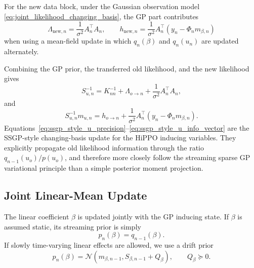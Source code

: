 \documentclass[12pt]{article}
\begin{document}
For the new data block, under the Gaussian observation model
\eqref{eq:joint_likelihood_changing_basis}, the GP part contributes
\begin{equation}
    \Lambda_{\mathrm{new},n}
    =
    \frac{1}{\sigma^2}A_n^\top A_n,
    \qquad
    h_{\mathrm{new},n}
    =
    \frac{1}{\sigma^2}
    A_n^\top
    \left(
        y_n-\Phi_n m_{\beta,n}
    \right)
\end{equation}
when using a mean-field update in which \(q_n(\beta)\) and \(q_n(u_n)\) are updated
alternately.

Combining the GP prior, the transferred old likelihood, and the new likelihood gives
\begin{equation}
    S_{u,n}^{-1}
    =
    K_{nn}^{-1}
    +
    \Lambda_{o\rightarrow n}
    +
    \frac{1}{\sigma^2}A_n^\top A_n,
    \label{eq:ssgp_style_u_precision}
\end{equation}
and
\begin{equation}
    S_{u,n}^{-1}m_{u,n}
    =
    h_{o\rightarrow n}
    +
    \frac{1}{\sigma^2}
    A_n^\top
    \left(
        y_n-\Phi_n m_{\beta,n}
    \right).
    \label{eq:ssgp_style_u_info_vector}
\end{equation}
Equations~\eqref{eq:ssgp_style_u_precision}--\eqref{eq:ssgp_style_u_info_vector}
are the SSGP-style changing-basis update for the HiPPO inducing variables. They
explicitly propagate old likelihood information through the ratio
\(q_{n-1}(u_o)/p(u_o)\), and therefore more closely follow the streaming sparse GP
variational principle than a simple posterior moment projection.

\subsection{Joint Linear-Mean Update}
\label{subsec:joint_linear_mean_update_transfer}

The linear coefficient \(\beta\) is updated jointly with the GP inducing state. If \(\beta\)
is assumed static, its streaming prior is simply
\begin{equation}
    p_n(\beta)=q_{n-1}(\beta).
\end{equation}
If slowly time-varying linear effects are allowed, we use a drift prior
\begin{equation}
    p_n(\beta)
    =
    \mathcal{N}
    \left(
        m_{\beta,n-1},
        S_{\beta,n-1}+Q_\beta
    \right),
    \qquad
    Q_\beta\succeq 0 .
    \label{eq:beta-drift-prior}
\end{equation}
\end{document}
